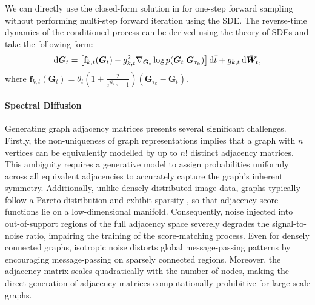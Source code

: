 \begin{proposition}
\label{pro:OUB}

\end{proposition}


We can directly use the closed-form solution in  for one-step forward sampling without performing multi-step forward iteration using the SDE.
%
The reverse-time dynamics of the conditioned process can be derived using the theory of SDEs and take the following form:
\begin{equation}
 \mathrm{d}\bm{G}_t = \left[\mathbf{f}_{k,t}(\bm{G}_t)-g_{k,t}^2 \nabla_{\bm{G}_t} \log p(\bm{G}_t|\bm{G}_{\tau_k})\right] \mathop{}\!\mathrm{d}\bar{t} + g_{k,t} \mathop{}\!\mathrm{d}\bar{\bm{W}}_t, \nonumber
\end{equation}
where $\mathbf{f}_{k,t}(\bm{G}_t) = \theta_t \left( 1 + \frac{2}{e^{2\bar{\theta}_{t:\tau_k}}-1}  \right)(\bm{G}_{\tau_k} - \bm{G}_t)$.


\paragraph{Spectral Diffusion}
Generating graph adjacency matrices presents several significant challenges.
Firstly, the non-uniqueness of graph representations implies that a graph with $n$ vertices can be equivalently modelled by up to $n!$ distinct adjacency matrices. This ambiguity requires a generative model to assign probabilities uniformly across all equivalent adjacencies to accurately capture the graph’s inherent symmetry. 
%
Additionally, unlike densely distributed image data, graphs typically follow a Pareto distribution and exhibit sparsity \cite{Sparsity+NP2024}, so that adjacency score functions lie on a low-dimensional manifold. Consequently, noise injected into out-of-support regions of the full adjacency space severely degrades the signal-to-noise ratio, impairing the training of the score-matching process. 
Even for densely connected graphs, isotropic noise distorts global message-passing patterns by encouraging message-passing on sparsely connected regions.
%
Moreover, the adjacency matrix scales quadratically with the number of nodes, making the direct generation of adjacency matrices computationally prohibitive for large-scale graphs.


